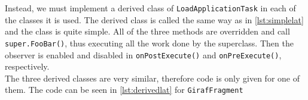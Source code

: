  Instead, we must implement a derived class of \lstinline|LoadApplicationTask| in each of the classes it is used.
 The derived class is called the same way as in \cref{lst:simplelat} and the class is quite simple.
 All of the three methods are overridden and call \lstinline!super.FooBar()!, thus executing all the work done by the superclass.
 Then the observer is enabled and disabled in  \lstinline!onPostExecute()! and \lstinline!onPreExecute()!, respectively.\\
 
 The three derived classes are very similar, therefore code is only given for one of them.
 The code can be seen in \cref{lst:derivedlat} for \lstinline!GirafFragment! 
